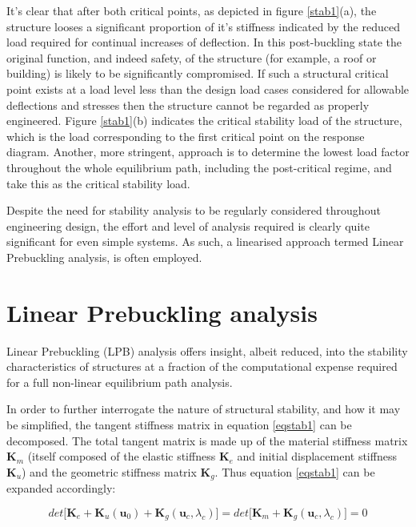 It's clear that after both critical points, as depicted in figure \ref{stab1}(a), the structure looses a significant proportion of it's stiffness indicated by the reduced load required for continual increases of deflection. In this post-buckling state the original function, and indeed safety, of the structure (for example, a roof or building) is likely to be significantly compromised. If such a structural critical point exists at a load level less than the design load cases considered for allowable deflections and stresses then the structure cannot be regarded as properly engineered. Figure \ref{stab1}(b) indicates the critical stability load of the structure, which is the load corresponding to the first critical point on the response diagram. Another, more stringent, approach is to determine the lowest load factor throughout the whole equilibrium path, including the post-critical regime, and take this as the critical stability load.

Despite the need for stability analysis to be regularly considered throughout engineering design, the effort and level of analysis required is clearly quite significant for even simple systems. As such, a linearised approach termed Linear Prebuckling analysis, is often employed.

\section{Linear Prebuckling analysis}
Linear Prebuckling (LPB) analysis offers insight, albeit reduced, into the stability characteristics of structures at a fraction of the computational expense required for a full non-linear equilibrium path analysis.

In order to further interrogate the nature of structural stability, and how it may be simplified, the tangent stiffness matrix in equation \ref{eqstab1} can be decomposed. The total tangent matrix is made up of the material stiffness matrix $\mathbf{K}_m$ (itself composed of the elastic stiffness $\mathbf{K}_e$ and initial displacement stiffness $\mathbf{K}_u$) and the geometric stiffness matrix $\mathbf{K}_g$. Thus equation \ref{eqstab1} can be expanded accordingly:

\begin{equation} 
det\big[
\mathbf{K}_e +
\mathbf{K}_u(\mathbf{u}_0) +
\mathbf{K}_g(\mathbf{u}_c,\lambda_c)
\big] = 
det\big[
\mathbf{K}_m +
\mathbf{K}_g(\mathbf{u}_c,\lambda_c)
\big] = 0
\label{eqstab2}
\end{equation}

